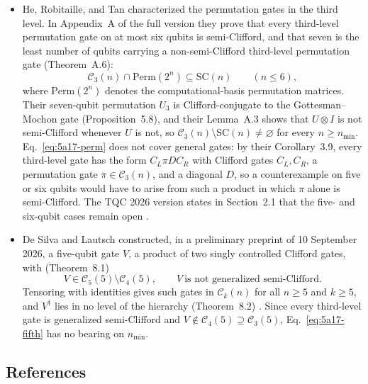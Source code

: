 \begin{itemize}
  \item He, Robitaille, and Tan characterized the permutation gates in the third
  level.  In Appendix~A of the full version they prove that every third-level
  permutation gate on at most six qubits is semi-Clifford, and that seven is the
  least number of qubits carrying a non-semi-Clifford third-level permutation
  gate (Theorem~A.6):
  \begin{equation}
    \mathcal{C}_3(n)\cap\mathrm{Perm}(2^n)\subseteq\mathrm{SC}(n)
    \qquad(n\leq6),
    \label{eq:5a17-perm}
  \end{equation}
  where $\mathrm{Perm}(2^n)$ denotes the computational-basis permutation
  matrices.  Their seven-qubit permutation $U_3$ is Clifford-conjugate to the
  Gottesman--Mochon gate (Proposition~5.8), and their Lemma~A.3 shows that
  $U\otimes I$ is not semi-Clifford whenever $U$ is not, so
  $\mathcal{C}_3(n)\setminus\mathrm{SC}(n)\neq\varnothing$ for every
  $n\geq n_{\min}$.  Eq.~\eqref{eq:5a17-perm} does not cover general gates: by
  their Corollary~3.9, every third-level gate has the form $C_L\pi DC_R$ with
  Clifford gates $C_L,C_R$, a permutation gate $\pi\in\mathcal{C}_3(n)$, and a
  diagonal $D$, so a counterexample on five or six qubits would have to arise
  from such a product in which $\pi$ alone is semi-Clifford.  The TQC 2026
  version states in Section~2.1 that the five- and six-qubit cases remain open
  .

  \item De Silva and Lautsch constructed, in a preliminary preprint of
  10 September 2026, a five-qubit gate $V$, a product of two singly controlled
  Clifford gates, with (Theorem~8.1)
  \begin{equation}
    V\in\mathcal{C}_5(5)\setminus\mathcal{C}_4(5),
    \qquad
    V\ \text{is not generalized semi-Clifford}.
    \label{eq:5a17-fifth}
  \end{equation}
  Tensoring with identities gives such gates in $\mathcal{C}_k(n)$ for all
  $n\geq5$ and $k\geq5$, and $V^\dagger$ lies in no level of the hierarchy
  (Theorem~8.2) .  Since every third-level
  gate is generalized semi-Clifford  and
  $V\notin\mathcal{C}_4(5)\supseteq\mathcal{C}_3(5)$,
  Eq.~\eqref{eq:5a17-fifth} has no bearing on $n_{\min}$.
\end{itemize}

\subsection*{References}

